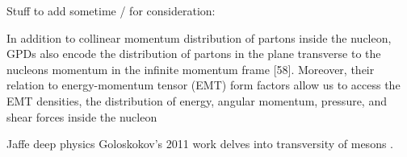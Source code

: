 \iffalse
Stuff to add sometime / for consideration:


            

    

        In addition to collinear momentum distribution of partons inside the
        nucleon, GPDs also encode the distribution of partons in the plane transverse to
        the nucleons momentum in the infinite momentum frame [58]. Moreover, their
        relation to energy-momentum tensor (EMT) form factors allow us to access the
        EMT densities, the distribution of energy, angular momentum, pressure, and shear
        forces inside the nucleon     

        

              Jaffe deep physics \parencite{Jaffe2022DeepPhysics} 
            Goloskokov's 2011 work delves into transversity of mesons \parencite{Goloskokov2011TransversityMesons}.


